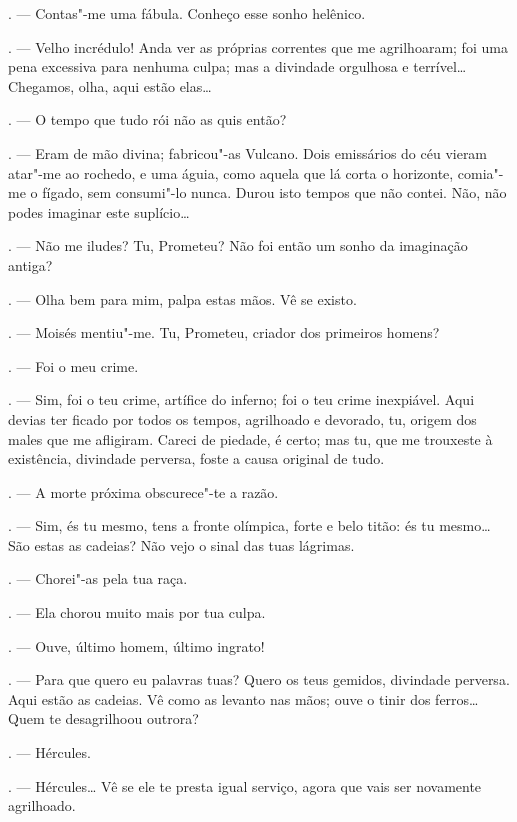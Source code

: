 \begin{linenumbers}
\begin{Parskip}
. --- Contas"-me uma fábula. Conheço esse sonho helênico.

. --- Velho incrédulo! Anda ver as próprias correntes que me
agrilhoaram; foi uma pena excessiva para nenhuma culpa; mas a divindade
orgulhosa e terrível\ldots{} Chegamos, olha, aqui estão elas\ldots{}

. --- O tempo que tudo rói não as quis então?

. --- Eram de mão divina; fabricou"-as Vulcano. Dois emissários do
céu vieram atar"-me ao rochedo, e uma águia, como aquela que lá corta o
horizonte, comia"-me o fígado, sem consumi"-lo nunca. Durou isto tempos
que não contei. Não, não podes imaginar este suplício\ldots{}

. --- Não me iludes? Tu, Prometeu? Não foi então um sonho da
imaginação antiga?

. --- Olha bem para mim, palpa estas mãos. Vê se existo.

. --- Moisés mentiu"-me. Tu, Prometeu, criador dos primeiros
homens?

. --- Foi o meu crime.

. --- Sim, foi o teu crime, artífice do inferno; foi o teu crime
inexpiável. Aqui devias ter ficado por todos os tempos, agrilhoado e
devorado, tu, origem dos males que me afligiram. Careci de piedade, é
certo; mas tu, que me trouxeste à existência, divindade perversa, foste
a causa original de tudo.

. --- A morte próxima obscurece"-te a razão.

. --- Sim, és tu mesmo, tens a fronte olímpica, forte e belo
titão: és tu mesmo\ldots{} São estas as cadeias? Não vejo o sinal das tuas
lágrimas.

. --- Chorei"-as pela tua raça.

. --- Ela chorou muito mais por tua culpa.

. --- Ouve, último homem, último ingrato!

. --- Para que quero eu palavras tuas? Quero os teus gemidos,
divindade perversa. Aqui estão as cadeias. Vê como as levanto nas mãos;
ouve o tinir dos ferros\ldots{} Quem te desagrilhoou outrora?

. --- Hércules.

. --- Hércules\ldots{} Vê se ele te presta igual serviço, agora que
vais ser novamente agrilhoado.


\end{Parskip}
\end{linenumbers}
